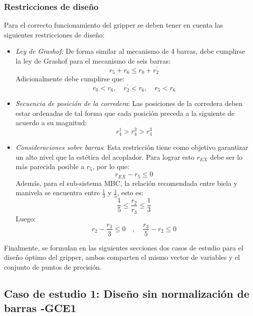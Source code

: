 \subsubsection{Restricciones de diseño}\label{sec:Restricciones de diseño MEC}
Para el correcto funcionamiento del gripper se deben tener en cuenta las siguientes restricciones de diseño: 
\begin{itemize}
\item \textit{Ley de Grashof:} De forma similar al mecanismo de 4 barras, debe cumplirse la ley de Grashof para el mecanismo de seis barras:
\begin{equation}
r_5+r_6 \leq r_0+r^{\prime}_2
\end{equation}
Adicionalmente debe cumplirse que:
\begin{equation}
r_0<r_6, \quad r^{\prime}_2<r_6 ,\quad r_5 < r_6
\end{equation}

\item \textit{Secuencia de posición de la corredera}: Las  posiciones de la corredera deben estar ordenadas de tal forma que cada posición preceda a la siguiente de acuerdo a su magnitud:
\begin{equation}
r^1_4 > r^2_4 > r^3_4
\end{equation}

\item \textit{Consideraciones sobre barras}: Esta restricción tiene como objetivo garantizar un alto nivel que la estética del acoplador. Para lograr esto $r_{EX}$ debe ser lo más parecida posible a $r_5$, por lo que: 
\begin{equation}
 r_{EX} - r_5 \leq 0
\end{equation}
Además, para el sub-sistema MBC, la relación recomendada entre biela y manivela se encuentra entre $\frac{1}{3}$ y $\frac{1}{5}$, esto es:
\begin{equation}
\frac{1}{5} \leq \frac{r_2}{r_3}\leq \frac{1}{3}
\end{equation}
Luego:
\begin{equation}
r_2 -\frac{r_3}{3} \leq 0 \quad , \quad \frac{r_3}{5} -r_2 \leq 0
\end{equation}
\end{itemize}

Finalmente, se formulan en las siguientes secciones dos casos de estudio para  el diseño óptimo del gripper, ambos comparten el mismo vector de variables y el conjunto de puntos de precisión.
\subsection{Caso de estudio 1: Diseño sin normalización de barras -GCE1}

